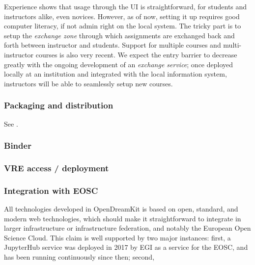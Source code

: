 \documentclass{deliverablereport}
\begin{document}
Experience shows that usage through the UI is straightforward, for
students and instructors alike, even novices. However, as of now,
setting it up requires good computer literacy, if not admin right on the
local system. The tricky part is to setup the \emph{exchange zone}
through which assignments are exchanged back and forth between
instructor and students. Support for multiple courses and
multi-instructor courses is also very recent. We expect the entry
barrier to decrease greatly with the ongoing development of an
\emph{exchange service}; once deployed locally at an institution and
integrated with the local information system, instructors will be able
to seamlessly setup new courses.

\subsubsection{Packaging and distribution}

See .

\subsubsection{Binder}

\subsubsection{VRE access / deployment}

\subsubsection{Integration with EOSC}

All technologies developed in OpenDreamKit is based on open, standard,
and modern web technologies, which should make it straightforward to
integrate in larger infrastructure or infrastructure federation, and
notably the European Open Science Cloud. This claim is well supported
by two major instances: first, a JupyterHub service was deployed in
2017 by EGI as a service for the EOSC, and has been running
continuously since then; second, 



\end{document}
